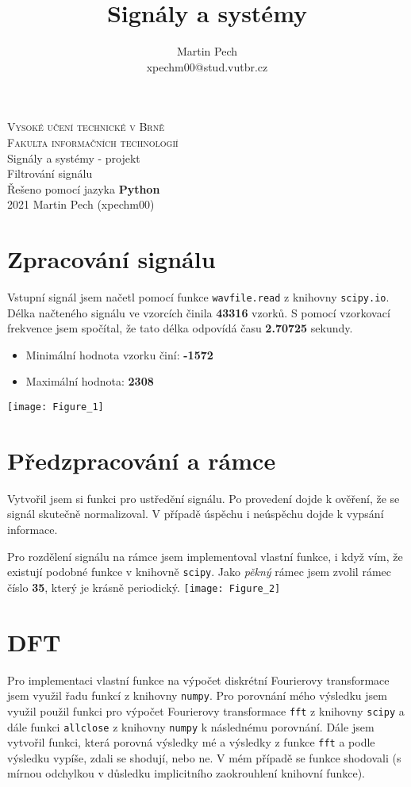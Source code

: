 \documentclass[10pt,a4paper,twocolumn]{article}
\title{Signály a systémy}
\author{Martin Pech\\xpechm00@stud.vutbr.cz}
\begin{document}
	\begin{titlepage}
	\begin{center}
		\Huge
		\textsc{Vysoké učení technické v Brně\\ Fakulta informačních technologií} \\[70mm]
		\LARGE
		Signály a systémy - projekt\\
		Filtrování signálu\\
		
		\Large Řešeno pomocí jazyka \textbf{Python}\\[130mm]
		{\Large 2021 \hspace{108mm}Martin Pech (xpechm00)}
	\end{center}
	\end{titlepage}



	\section{Zpracování signálu}
	Vstupní signál jsem načetl pomocí funkce \texttt{wavfile.read} z knihovny \texttt{scipy.io}.
	Délka načteného signálu ve vzorcích činila \textbf{43316} vzorků. S pomocí vzorkovací frekvence jsem spočítal, že tato délka odpovídá času \textbf{2.70725} sekundy.
	\begin{itemize}
	\item Minimální hodnota vzorku činí: \textbf{-1572}
	\item Maximální hodnota: \textbf{2308}
	\end{itemize}
	\hspace*{-1cm}  
	\texttt{[image: Figure\_1]}
	
	\section{Předzpracování a rámce}
	Vytvořil jsem si funkci pro ustředění signálu. Po provedení dojde k ověření, že se signál skutečně normalizoval. V případě úspěchu i neúspěchu dojde k vypsání informace.
	
	Pro rozdělení signálu na rámce jsem implementoval vlastní funkce, i když vím, že existují podobné funkce v knihovně \texttt{scipy}. Jako \textit{pěkný} rámec jsem zvolil rámec číslo \textbf{35}, který je krásně periodický.
	\hspace*{-1cm}
	\texttt{[image: Figure\_2]}
	
	\section{DFT}
	Pro implementaci vlastní funkce na výpočet diskrétní Fourierovy transformace jsem využil řadu funkcí z knihovny \texttt{numpy}. Pro porovnání mého výsledku jsem využil použil funkci pro výpočet Fourierovy transformace \texttt{fft} z knihovny \texttt{scipy} a dále funkci \texttt{allclose} z knihovny \texttt{numpy} k následnému porovnání.
	Dále jsem vytvořil funkci, která porovná výsledky mé a výsledky z funkce \texttt{fft} a podle výsledku vypíše, zdali se shodují, nebo ne. V mém případě se funkce shodovali (s mírnou odchylkou v důsledku implicitního zaokrouhlení knihovní funkce).
	
\end{document}
